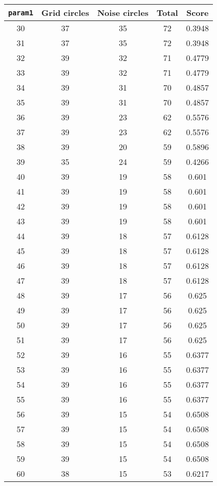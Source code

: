 \documentclass[letterpaper, 12pt]{article}
\begin{document}
\begin{longtable}{|c|c|c|c|c|}
\hline
\textbf{\texttt{param1}} & \textbf{Grid circles} & \textbf{Noise circles} & \textbf{Total} & \textbf{Score} \\
\hline
30 & 37 & 35 & 72 & 0.3948 \\
\hline
31 & 37 & 35 & 72 & 0.3948 \\
\hline
32 & 39 & 32 & 71 & 0.4779 \\
\hline
33 & 39 & 32 & 71 & 0.4779 \\
\hline
34 & 39 & 31 & 70 & 0.4857 \\
\hline
35 & 39 & 31 & 70 & 0.4857 \\
\hline
36 & 39 & 23 & 62 & 0.5576 \\
\hline
37 & 39 & 23 & 62 & 0.5576 \\
\hline
38 & 39 & 20 & 59 & 0.5896 \\
\hline
39 & 35 & 24 & 59 & 0.4266 \\
\hline
40 & 39 & 19 & 58 & 0.601 \\
\hline
41 & 39 & 19 & 58 & 0.601 \\
\hline
42 & 39 & 19 & 58 & 0.601 \\
\hline
43 & 39 & 19 & 58 & 0.601 \\
\hline
44 & 39 & 18 & 57 & 0.6128 \\
\hline
45 & 39 & 18 & 57 & 0.6128 \\
\hline
46 & 39 & 18 & 57 & 0.6128 \\
\hline
47 & 39 & 18 & 57 & 0.6128 \\
\hline
48 & 39 & 17 & 56 & 0.625 \\
\hline
49 & 39 & 17 & 56 & 0.625 \\
\hline
50 & 39 & 17 & 56 & 0.625 \\
\hline
51 & 39 & 17 & 56 & 0.625 \\
\hline
52 & 39 & 16 & 55 & 0.6377 \\
\hline
53 & 39 & 16 & 55 & 0.6377 \\
\hline
54 & 39 & 16 & 55 & 0.6377 \\
\hline
55 & 39 & 16 & 55 & 0.6377 \\
\hline
56 & 39 & 15 & 54 & 0.6508 \\
\hline
57 & 39 & 15 & 54 & 0.6508 \\
\hline
58 & 39 & 15 & 54 & 0.6508 \\
\hline
59 & 39 & 15 & 54 & 0.6508 \\
\hline
60 & 38 & 15 & 53 & 0.6217 \\

\end{longtable}
\end{document}
